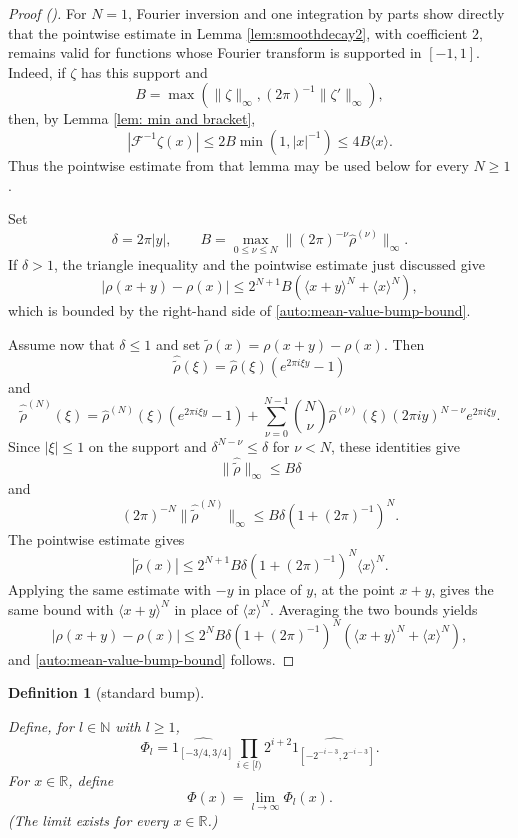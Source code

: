 \documentclass[12pt,reqno]{amsart}
\newcommand{\auto}{{({\tiny\faCar})}}
\theoremstyle{plain}
\newtheorem{definition}[theorem]{Definition}
\numberwithin{equation}{section}
\theoremstyle{remark}
\newcommand{\uses}[1]{}
\newcommand{\usesdefs}[1]{}
\newcommand{\lean}[1]{}
\newcommand{\R}{{\mathbb R}}
\newcommand{\N}{{\mathbb N}}
\begin{document}
\begin{proof}[Proof \auto]
For $N=1$, Fourier inversion and one integration by parts show directly that the pointwise estimate in Lemma \ref{lem:smoothdecay2}, with coefficient $2$, remains valid for functions whose Fourier transform is supported in $[-1,1]$. Indeed, if $\zeta$ has this support and
\[
B=\max(\|\zeta\|_\infty,(2\pi)^{-1}\|\zeta'\|_\infty),
\]
then, by Lemma \ref{lem: min and bracket},
\[
|\mathcal F^{-1}\zeta(x)|\le2B\min(1,|x|^{-1})\le4B\langle x\rangle.
\]
Thus the pointwise estimate from that lemma may be used below for every $N\ge1$.

Set
\[
\delta=2\pi|y|,
\qquad
B=\max_{0\le \nu\le N}\|(2\pi)^{-\nu}\widehat\rho^{(\nu)}\|_\infty.
\]
If $\delta>1$, the triangle inequality and the pointwise estimate just discussed give
\[
|\rho(x+y)-\rho(x)|
\le2^{N+1}B(\langle x+y\rangle^N+\langle x\rangle^N),
\]
which is bounded by the right-hand side of \eqref{auto:mean-value-bump-bound}.

Assume now that $\delta\le1$ and set $\widetilde\rho(x)=\rho(x+y)-\rho(x)$. Then
\[
\widehat{\widetilde\rho}(\xi)=\widehat\rho(\xi)(e^{2\pi i\xi y}-1)
\]
and
\[
\widehat{\widetilde\rho}^{(N)}(\xi)
=\widehat\rho^{(N)}(\xi)(e^{2\pi i\xi y}-1)
+\sum_{\nu=0}^{N-1}\binom N\nu\widehat\rho^{(\nu)}(\xi)(2\pi iy)^{N-\nu}e^{2\pi i\xi y}.
\]
Since $|\xi|\le1$ on the support and $\delta^{N-\nu}\le\delta$ for $\nu<N$, these identities give
\[
\|\widehat{\widetilde\rho}\|_\infty\le B\delta
\]
and
\[
(2\pi)^{-N}\|\widehat{\widetilde\rho}^{(N)}\|_\infty
\le B\delta(1+(2\pi)^{-1})^N.
\]
The pointwise estimate gives
\[
|\widetilde\rho(x)|
\le2^{N+1}B\delta(1+(2\pi)^{-1})^N\langle x\rangle^N.
\]
Applying the same estimate with $-y$ in place of $y$, at the point $x+y$, gives the same bound with $\langle x+y\rangle^N$ in place of $\langle x\rangle^N$. Averaging the two bounds yields
\[
|\rho(x+y)-\rho(x)|
\le2^NB\delta(1+(2\pi)^{-1})^N(\langle x+y\rangle^N+\langle x\rangle^N),
\]
and \eqref{auto:mean-value-bump-bound} follows.
\end{proof}


\begin{definition}[standard bump]\label{standard bump}\uses{}\usesdefs{}
\lean{Auto.standardBumpFinite,Auto.standardBump,Auto.standardBumpRescale}
Define, for \(l\in\N\) with \(l\ge1\),
\begin{equation}\label{auto:standard-bump-finite-product}
 \Phi_l
 =
 \widehat{1_{[-3/4,3/4]}}
 \prod_{i\in [l)}
 2^{i+2}
 \widehat{1_{[-2^{-i-3},2^{-i-3}]}} .
\end{equation}
For $x\in\R$, define
\begin{equation}\label{auto:standard-bump-limit}\Phi(x)=\lim_{l\to\infty}\Phi_l(x).\end{equation}
(The limit exists for every $x\in\R$.)
\end{definition}
\end{document}
